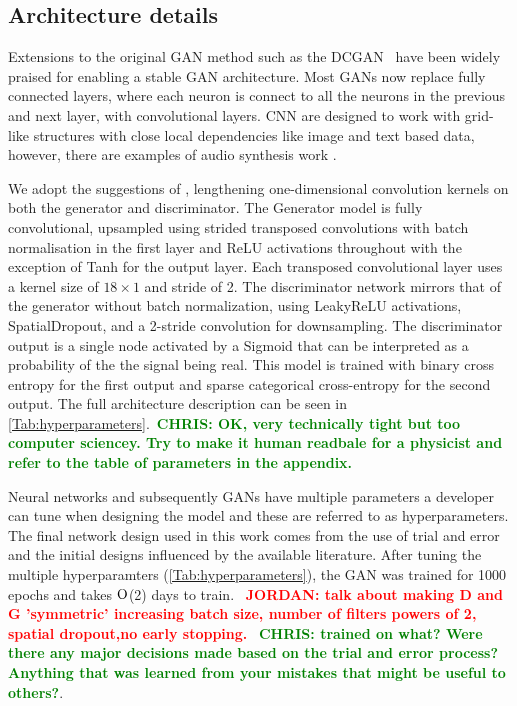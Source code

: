 \documentclass[12pt]{iopart}
\newcommand{\jordan}[1]{\textbf{\textcolor{red}{JORDAN: #1}}}
\newcommand{\chris}[1]{\textbf{\textcolor{green}{CHRIS: #1}}}
\begin{document}
\subsection{Architecture details}

%
Extensions to the original \ac{GAN} method such as the
\ac{DCGAN}~\cite{Radford2015} have been widely praised for
enabling a stable \ac{GAN} architecture. Most GANs now replace fully connected layers, where each neuron is connect to all the neurons in the previous and next layer, with convolutional layers. \ac{CNN} are designed to work with grid-like structures with close local dependencies like image and text based data, however, there are examples of audio synthesis work \cite{DBLP:journals/corr/abs-1809-11096}.

%
We adopt the suggestions of \cite{Radford2015,DBLP:journals/corr/abs-1809-11096}, lengthening
one-dimensional convolution kernels on both the generator and discriminator.
The Generator model is fully convolutional, upsampled using strided transposed
convolutions with batch normalisation in the first layer and ReLU activations
throughout with the exception of Tanh for the output layer. Each transposed
convolutional layer uses a kernel size of $18\times 1$ and stride of 2. The
discriminator network mirrors that of the generator without batch
normalization, using LeakyReLU activations, SpatialDropout, and a 2-stride
convolution for downsampling. The discriminator output is a single node activated by a Sigmoid that can be interpreted as
a probability of the the signal being real. This model is trained
with binary cross entropy for the first output and sparse categorical
cross-entropy for the second output. The full architecture description can be seen in \cref{Tab:hyperparameters}.~\chris{OK, very technically tight but too
computer sciencey. Try to make it human readbale for a physicist and refer to
the table of parameters in the appendix.}

%
Neural networks and subsequently \acp{GAN} have multiple parameters a developer
can tune when designing the model and these are referred to as hyperparameters.
The final network design used in this work comes from the use of trial and
error and the initial designs influenced by the available literature. After
tuning the multiple hyperparamters (\cref{Tab:hyperparameters}), the GAN
was trained for 1000 epochs and takes $\mathord{\mathrm{O}}$(2) days to train. ~\jordan{talk about making D and G 'symmetric' increasing batch size, number of filters powers of 2, spatial dropout,no early stopping.} ~\chris{trained on
what? Were there any major decisions made based on the trial and error process?
Anything that was learned from your mistakes that might be useful to others?}.
\end{document}
